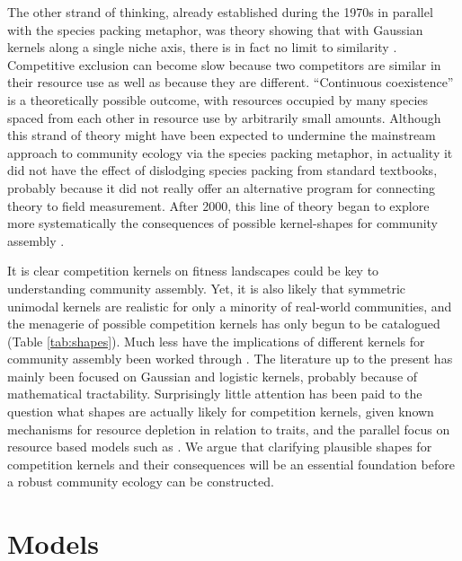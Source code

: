 \documentclass[a4paper,11pt]{article}
\begin{document}
The other strand of thinking, already established during the 1970s in
parallel with the species packing metaphor, was theory showing that
with Gaussian kernels along a single niche axis, there is in fact no
limit to similarity \citep{May-1972, Abrams-1975,
  Abrams-1983}. Competitive exclusion can become slow because two
competitors are similar in their resource use as well as because they
are different. ``Continuous coexistence'' is a theoretically possible
outcome, with resources occupied by many species spaced from each
other in resource use by arbitrarily small amounts.
Although this strand of theory might have been expected to undermine
the mainstream approach to community ecology via the species packing
metaphor, in actuality it did not have the effect of dislodging
species packing from standard textbooks, probably because it did not
really offer an alternative program for connecting theory to field
measurement.  After 2000, this line of theory began to explore more
systematically the consequences of possible kernel-shapes for
community assembly \citep{Scheffer-2006, Barabas-2013, Leimar-2013}.

It is clear competition kernels on fitness landscapes could be key to
understanding community assembly. Yet, it is also likely that
symmetric unimodal kernels are realistic for only a minority of
real-world communities, and the menagerie of possible competition
kernels has only begun to be catalogued (Table \ref{tab:shapes}).
Much less have the implications of different kernels for community
assembly been worked through
\citep{Barabas-2012,Barabas-2013,DAndrea-2013,Leimar-2013}.  The
literature up to the present has mainly been focused on Gaussian and
logistic kernels, probably because of mathematical tractability.
Surprisingly little attention has been paid to the question what
shapes are actually likely for competition kernels, given known
mechanisms for resource depletion in relation to traits, and the
parallel focus on resource based models such as \Rstar.
We argue that clarifying plausible shapes for competition kernels and
their consequences will be an essential foundation before a robust
community ecology can be constructed.

\section{Models}
\end{document}
